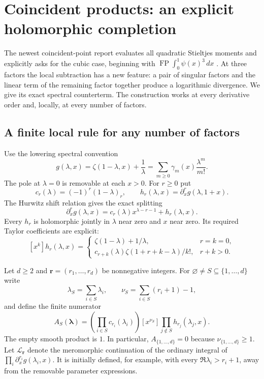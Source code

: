 \documentclass[11pt,a4paper]{article}
\theoremstyle{definition}
\theoremstyle{remark}
\DeclareMathOperator*{\FP}{FP}
\numberwithin{equation}{section}
\begin{document}
\section{Coincident products: an explicit holomorphic completion}
\label{cub:sec}

The newest coincident-point report evaluates all quadratic Stieltjes
moments and explicitly asks for the cubic case, beginning with
$\FP\int_0^1\psi(x)^3\,dx$ \cite{IncomingCoincident}.
At three factors the local subtraction has a new feature: a pair of
singular factors and the linear term of the remaining factor together
produce a logarithmic divergence.  We give its exact spectral
counterterm.  The construction works at every derivative order and,
locally, at every number of factors.

\subsection{A finite local rule for any number of factors}

Use the lowering spectral convention
\begin{equation}\label{cub:generator}
 g(\lambda,x)=\zeta(1-\lambda,x)+\frac1\lambda
   =\sum_{m\ge0}\gamma_m(x)\frac{\lambda^m}{m!}.
\end{equation}
The pole at $\lambda=0$ is removable at each $x>0$.
For $r\ge0$ put
\[
 c_r(\lambda)=(-1)^r(1-\lambda)_r,
 \qquad h_r(\lambda,x)=\partial_x^r g(\lambda,1+x).
\]
The Hurwitz shift relation gives the exact splitting
\begin{equation}\label{cub:local-split}
 \partial_x^r g(\lambda,x)
 =c_r(\lambda)x^{\lambda-r-1}+h_r(\lambda,x).
\end{equation}
Every $h_r$ is holomorphic jointly in $\lambda$ near zero and $x$ near
zero.  Its required Taylor coefficients are explicit:
\begin{equation}\label{cub:h-coefficients}
 [x^k]h_r(\lambda,x)=
 \begin{cases}
 \zeta(1-\lambda)+1/\lambda,&r=k=0,\\[2pt]
 c_{r+k}(\lambda)\zeta(1+r+k-\lambda)/k!,&r+k>0.
 \end{cases}
\end{equation}

Let $d\ge2$ and $\boldsymbol r=(r_1,\ldots,r_d)$ be nonnegative
integers.  For $\varnothing\ne S\subseteq\{1,\ldots,d\}$ write
\[
 \lambda_S=\sum_{i\in S}\lambda_i,
 \qquad \nu_S=\sum_{i\in S}(r_i+1)-1,
\]
and define the finite numerator
\begin{equation}\label{cub:subset-numerator}
 A_S(\boldsymbol\lambda)=
 \left(\prod_{i\in S}c_{r_i}(\lambda_i)\right)
 [x^{\nu_S}]\prod_{j\notin S}h_{r_j}(\lambda_j,x).
\end{equation}
The empty smooth product is $1$.  In particular, $A_{\{1,\ldots,d\}}=0$
because $\nu_{\{1,\ldots,d\}}\ge1$.
Let $\mathcal L_{\boldsymbol r}$ denote the meromorphic continuation
of the ordinary integral of $\prod_i\partial_x^{r_i}g(\lambda_i,x)$.
It is initially defined, for example, with every
$\Re\lambda_i>r_i+1$, away from the removable parameter expressions.
\end{document}
